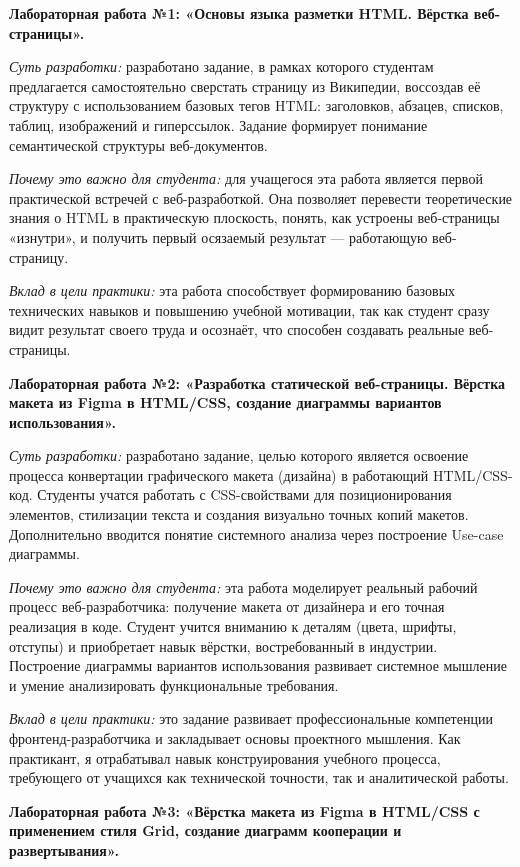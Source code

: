\textbf{Лабораторная работа №1: «Основы языка разметки HTML. Вёрстка веб-страницы».}

\textit{Суть разработки:} разработано задание, в рамках которого студентам предлагается самостоятельно сверстать страницу из Википедии, воссоздав её структуру с использованием базовых тегов HTML: заголовков, абзацев, списков, таблиц, изображений и гиперссылок. Задание формирует понимание семантической структуры веб-документов.

\textit{Почему это важно для студента:} для учащегося эта работа является первой практической встречей с веб-разработкой. Она позволяет перевести теоретические знания о HTML в практическую плоскость, понять, как устроены веб-страницы «изнутри», и получить первый осязаемый результат — работающую веб-страницу.

\textit{Вклад в цели практики:} эта работа способствует формированию базовых технических навыков и повышению учебной мотивации, так как студент сразу видит результат своего труда и осознаёт, что способен создавать реальные веб-страницы.

\vspace{1em}
\textbf{Лабораторная работа №2: «Разработка статической веб-страницы. Вёрстка макета из Figma в HTML/CSS, создание диаграммы вариантов использования».}

\textit{Суть разработки:} разработано задание, целью которого является освоение процесса конвертации графического макета (дизайна) в работающий HTML/CSS-код. Студенты учатся работать с CSS-свойствами для позиционирования элементов, стилизации текста и создания визуально точных копий макетов. Дополнительно вводится понятие системного анализа через построение Use-case диаграммы.

\textit{Почему это важно для студента:} эта работа моделирует реальный рабочий процесс веб-разработчика: получение макета от дизайнера и его точная реализация в коде. Студент учится вниманию к деталям (цвета, шрифты, отступы) и приобретает навык вёрстки, востребованный в индустрии. Построение диаграммы вариантов использования развивает системное мышление и умение анализировать функциональные требования.

\textit{Вклад в цели практики:} это задание развивает профессиональные компетенции фронтенд-разработчика и закладывает основы проектного мышления. Как практикант, я отрабатывал навык конструирования учебного процесса, требующего от учащихся как технической точности, так и аналитической работы.

\vspace{1em}
\textbf{Лабораторная работа №3: «Вёрстка макета из Figma в HTML/CSS с применением стиля Grid, создание диаграмм кооперации и развертывания».}

